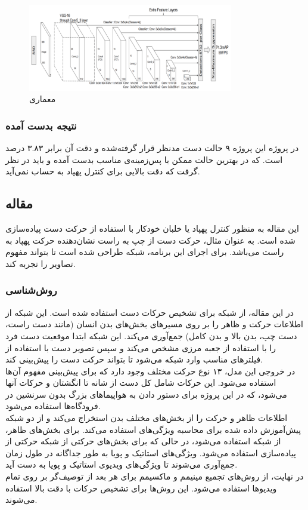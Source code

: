 \begin{figure}[h]
    \centering
    \includegraphics[width=0.8\textwidth]{VGG16.png}
    \caption{معماری }
\end{figure}

\subsubsection{نتیجه بدست آمده}
 در پروژه این پروژه ۹ حالت دست مدنظر قرار گرفته‌شده و دقت آن برابر ۳.۸۳ درصد است.
 که در بهترین حالت ممکن با پس‌زمینه‌ی مناسب بدست آمده و باید در نظر گرفت که دقت بالایی برای کنترل پهپاد به حساب نمی‌آید.
\cite{hadri2018hand}

\subsection{مقاله }
این مقاله به منظور کنترل پهپاد یا خلبان خودکار با استفاده از حرکت دست پیاده‌سازی شده است. به عنوان مثال، حرکت دست از چپ به راست نشان‌دهنده حرکت پهپاد به راست می‌باشد. 
برای اجرای این برنامه، شبکه  طراحی شده است تا بتواند مفهوم تصاویر را تجربه کند.

\subsubsection{روش‌شناسی}
در این مقاله، از شبکه   برای تشخیص حرکات دست استفاده شده است. این شبکه از اطلاعات حرکت و ظاهر را بر روی مسیرهای بخش‌های بدن انسان (مانند دست راست، 
دست چپ، بدن بالا و بدن کامل) جمع‌آوری می‌کند. این شبکه ابتدا موقعیت دست فرد را با استفاده از جعبه مرزی مشخص می‌کند و سپس تصویر دست با استفاده از فیلترهای مناسب وارد شبکه  می‌شود تا بتواند حرکت دست را پیش‌بینی کند.
\\
در خروجی این مدل، ۱۳ نوع حرکت مختلف وجود دارد که برای پیش‌بینی مفهوم آن‌ها استفاده می‌شود. این حرکات شامل کل دست از شانه تا انگشتان و حرکات آنها می‌شود، که در این پروژه برای دستور دادن به هواپیماهای بزرگ بدون سرنشین در فرودگاه‌ها استفاده می‌شود.
\\
 اطلاعات ظاهر و حرکت را از بخش‌های مختلف بدن استخراج می‌کند و از دو شبکه پیش‌آموزش داده شده برای محاسبه ویژگی‌های  استفاده می‌کند. برای بخش‌های ظاهر، از شبکه  استفاده می‌شود، در حالی که برای 
بخش‌های حرکتی از شبکه حرکتی از پیاده‌سازی  استفاده می‌شود. ویژگی‌های استاتیک و پویا به طور جداگانه در طول زمان جمع‌آوری می‌شوند تا ویژگی‌های ویدیوی استاتیک و پویا به دست آید.
\\
در نهایت، از روش‌های تجمیع مینیمم و ماکسیمم برای هر بعد از توصیف‌گر بر روی تمام ویدیوها استفاده می‌شود. این روش‌ها برای تشخیص حرکات با دقت بالا استفاده می‌شوند.



